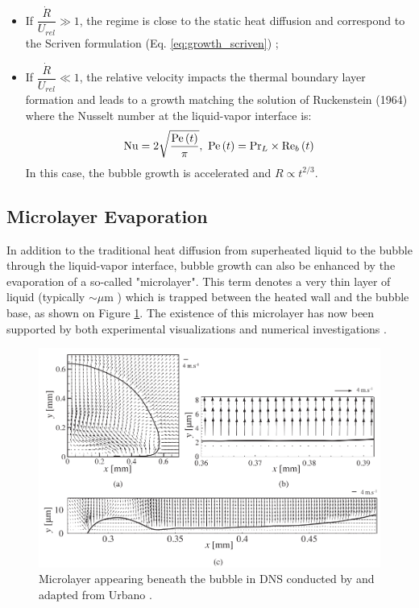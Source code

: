 \begin{itemize}
\item If $\dfrac{\dot{R}}{U_{rel}}\gg 1$, the regime is close to the static heat diffusion and correspond to the Scriven formulation (Eq. \ref{eq:growth_scriven}) ;

\item If $\dfrac{\dot{R}}{U_{rel}}\ll 1$, the relative velocity impacts the thermal boundary layer formation and leads to a growth matching the solution of Ruckenstein (1964) \cite{ruckenstein_mass_1964} where the Nusselt number at the liquid-vapor interface is:
\begin{equation}
\Nu = 2\sqrt{\frac{\Pe\parth{t}}{\pi}},\ \Pe\parth{t} = \Pr_{L}\times \Re_{b}\parth{t}
\end{equation}
In this case, the bubble growth is accelerated and $R \propto t^{2/3}$. 
\end{itemize}


\subsection{Microlayer Evaporation}
\label{subsec:microlayer}

In addition to the traditional heat diffusion from superheated liquid to the bubble through the liquid-vapor interface, bubble growth can also be enhanced by the evaporation of a so-called "microlayer". This term denotes a very thin layer of liquid (typically $\sim \mu$m \cite{kossolapov_experimental_2021}) which is trapped between the heated wall and the bubble base, as shown on Figure \ref{fig:ML_Urbano}. The existence of this microlayer has now been supported by both experimental visualizations \cite{kossolapov_experimental_2021, koffman_experimental_1983, chen_detailed_2017, chen_measurement_2020} and numerical investigations \cite{urbano_direct_2018, guion_simulations_2018, bures_modelling_2021}.

\begin{figure}[h!]
\centering
\includegraphics[width=0.7\linewidth]{img/growth/ML_urbano.PNG}
\caption{Microlayer appearing beneath the bubble in DNS conducted by and adapted from Urbano \etal \cite{urbano_direct_2018}.}
\label{fig:ML_Urbano}
\end{figure}


